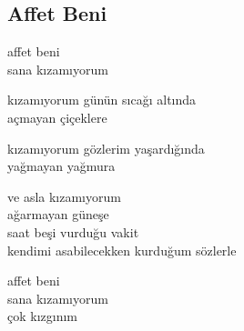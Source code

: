 \subsection{Affet Beni}

affet beni \\
sana kızamıyorum

\noindent\newline
kızamıyorum günün sıcağı altında \\
açmayan çiçeklere

\noindent\newline
kızamıyorum gözlerim yaşardığında \\
yağmayan yağmura

\noindent\newline
ve asla kızamıyorum \\
ağarmayan güneşe \\
saat beşi vurduğu vakit \\
kendimi asabilecekken kurduğum sözlerle

\noindent\newline
affet beni \\
sana kızamıyorum \\
çok kızgınım